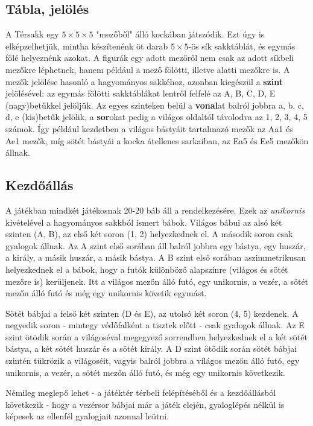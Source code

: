 \documentclass[12pt, twoside]{report}
\begin{document}
\subsection{Tábla, jelölés}
A Térsakk egy $ 5 \times 5 \times 5 $ "mezőből" álló kockában játszódik. Ezt úgy is elképzelhetjük, mintha készítenénk öt darab $ 5 \times 5 $-ös sík sakktáblát, és egymás fölé helyeznénk azokat. A figurák egy adott mezőről nem csak az adott síkbeli mezőkre léphetnek, hanem például a mező fölötti, illetve alatti mezőkre is. A mezők jelölése hasonló a hagyományos sakkéhoz, azonban kiegészül a \textbf{szint} jelölésével: az egymás fölötti sakktáblákat lentről felfelé az A, B, C, D, E (nagy)betűkkel jelöljük. Az egyes szinteken belül a \textbf{vonal}at balról jobbra a, b, c, d, e (kis)betűk jelölik, a \textbf{sor}okat pedig a világos oldaltól távolodva az 1, 2, 3, 4, 5 számok. Így például kezdetben a világos bástyáit tartalmazó mezők az Aa1 és Ae1 mezők, míg sötét bástyái a kocka átellenes sarkaiban, az Ea5 és Ee5 mezőkön állnak.

\subsection{Kezdőállás}
A játékban mindkét játékosnak 20-20 báb áll a rendelkezésére. Ezek az \textit{unikornis} kivételével a hagyományos sakkból ismert bábok. Világos bábui az alsó két szinten (A, B), az első két soron (1, 2) helyezkednek el. A második soron csak gyalogok állnak. Az A szint első sorában áll balról jobbra egy bástya, egy huszár, a király, a másik huszár, a másik bástya. A B szint első sorában aszimmetrikusan helyezkednek el a bábok, hogy a futók különböző alapszínre (világos és sötét mezőre is) kerüljenek. Itt a világos mezőn álló futó, egy unikornis, a vezér, a sötét mezőn álló futó és még egy unikornis követik egymást.

Sötét bábjai a felső két szinten (D és E), az utolsó két soron (4, 5) kezdenek. A negyedik soron - mintegy védőfalként a tisztek előtt - csak gyalogok állnak. Az E szint ötödik során a világoséval megegyező sorrendben helyezkednek el a két sötét bástya, a két sötét huszár és a sötét király. A D szint ötödik során sötét bábjai szintén tükrözik a világoséit, vagyis balról jobbra a világos mezőn álló futó, egy unikornis, a vezér, a sötét mezőn álló futó, és még egy unikornis következik.

Némileg meglepő lehet - a játéktér térbeli felépítéséből és a kezdőállásból következik - hogy a vezérsor bábjai már a játék elején, gyaloglépés nélkül is képesek az ellenfél gyalogjait azonnal leütni.
\end{document}
